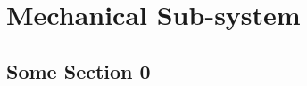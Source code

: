 \chapter{Mechanical Sub-system}
\thispagestyle{fancy}

%
%
%
%

\blindtext %



\section{Some Section 0}
\blindtext %



